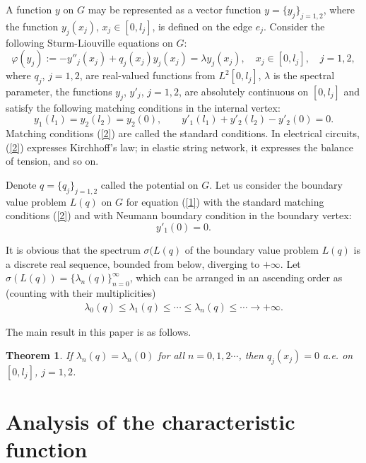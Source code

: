 \documentclass[reqno,11pt,centertags]{amsart}
\numberwithin{equation}{section}
\newtheorem{theorem}{Theorem}[section]
\theoremstyle{definition}
\begin{document}
A function $y$ on $G$ may be represented as a vector function $y=\{y_{j}\}_{j=1,2}$, where the function $y_{j}(x_{j})$, $x_{j}\in[0,l_{j}]$, is defined on the edge $e_{j}$. Consider the following Sturm-Liouville equations on $G$:
\begin{equation}\label{1}
  \varphi(y_{j}):=-y''_{j}(x_{j})+q_{j}(x_{j})y_{j}(x_{j})=\lambda y_{j}(x_{j}),\quad x_{j}\in[0,l_{j}],\quad j=1,2,
\end{equation}
where $q_{j}$, $j=1,2$, are real-valued functions from $L^{2}[0,l_{j}]$, $\lambda$ is the spectral parameter, the functions $y_{j}$, $y'_{j}$, $j=1,2$, are absolutely continuous on $[0,l_{j}]$ and satisfy the following matching conditions in the internal vertex:
\begin{equation}\label{2}
  y_{1}(l_{1})=y_{2}(l_{2})=y_{2}(0),\qquad y'_{1}(l_{1})+y'_{2}(l_{2})-y'_{2}(0)=0.
\end{equation}
Matching conditions (\ref{2}) are called the standard conditions. In electrical circuits, (\ref{2}) expresses Kirchhoff's law; in elastic string network, it expresses the balance of tension, and so on.

Denote $q=\{q_{j}\}_{j=1,2}$ called the potential on $G$. Let us consider the boundary value problem $L(q)$  on $G$ for equation (\ref{1}) with the standard matching conditions (\ref{2}) and with Neumann boundary condition in the boundary vertex:
\begin{equation}\label{3}
  y'_{1}(0)=0.
\end{equation}

It is obvious that the spectrum $\sigma(L(q)$ of the boundary value problem $L(q)$ is a discrete real sequence, bounded from below, diverging to $+\infty$. Let $\sigma(L(q))=\{\lambda_{n}(q)\}_{n=0}^{\infty}$, which can be arranged in an ascending order as (counting with their multiplicities)
\begin{align}
\lambda_{0}(q) \leq \lambda_{1}(q) \leq \cdots  \leq\lambda_{n}(q) \leq \cdots \longrightarrow +\infty. \nonumber
\end{align}


The main result in this paper is as follows.
\begin{theorem}\label{th}
If $\lambda_{n}(q)=\lambda_{n}(0)$ for all $n=0,1,2\cdots$, then $q_{j}(x_{j})=0$ a.e. on $[0,l_{j}]$, $j=1,2$.
\end{theorem}


	
\section{Analysis of the characteristic function}
	
\end{document}
